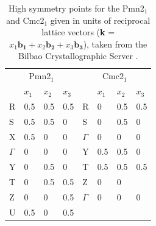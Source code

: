 \begin{table}[]
\centering
\caption{High symmetry points for the Pmn2$_1$ and Cmc2$_1$ given in units of reciprocal lattice vectors (\textbf{k} = $x_1\mathbf{b_1} + x_2\mathbf{b_2} + x_3\mathbf{b_3}$), taken from the Bilbao Crystallographic Server \cite{Bilbao, Bilbao2}.}
\label{symm_points}
\begin{tabular}{llll|llll}
\toprule[1.2pt]
\multicolumn{4}{c}{Pmn2$_1$}     & \multicolumn{4}{c}{Cmc2$_1$}     \\
         & $x_1$ & $x_2$ & $x_3$ &          & $x_1$ & $x_2$ & $x_3$\\  \midrule[1pt]
R        & 0.5   & 0.5   & 0.5   & R        & 0     & 0.5   & 0.5   \\
S        & 0.5   & 0.5   & 0     & S        & 0     & 0.5   & 0     \\
X        & 0.5   & 0     & 0     & $\Gamma$ & 0     & 0     & 0     \\
$\Gamma$ & 0     & 0     & 0     & Y        & 0.5   & 0.5   & 0     \\
Y        & 0     & 0.5   & 0     & T        & 0.5   & 0.5   & 0.5   \\
T        & 0     & 0.5   & 0.5   & Z        & 0     & 0     &       \\
Z        & 0     & 0     & 0.5   & $\Gamma$   & 0     & 0     & 0     \\
U        & 0.5   & 0     & 0.5   &          &       &       &      
\\ \bottomrule[1.2pt]
\end{tabular}
\end{table}